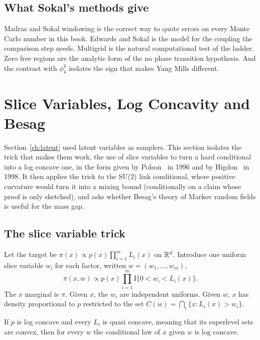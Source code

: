 \subsection{What Sokal's methods give}

Madras and Sokal windowing is the correct way to quote errors on every Monte Carlo number in this book. Edwards and Sokal is the model for the coupling the comparison step needs. Multigrid is the natural computational test of the ladder. Zero free regions are the analytic form of the no phase transition hypothesis. And the contrast with $\phi^4_4$ isolates the sign that makes Yang Mills different.

\section{Slice Variables, Log Concavity and Besag}\label{ch:slice}

Section~\ref{ch:latent} used latent variables as samplers. This section isolates the trick that makes them work, the use of slice variables to turn a hard conditional into a log concave one, in the form given by Polson~\cite{Po96} in 1996 and by Higdon~\cite{Hi98} in 1998. It then applies the trick to the SU(2) link conditional, where positive curvature would turn it into a mixing bound (conditionally on a claim whose proof is only sketched), and asks whether Besag's theory of Markov random fields is useful for the mass gap.

\subsection{The slice variable trick}\label{sec:c5slice}

Let the target be $\pi(x)\propto p(x)\prod_{i=1}^mL_i(x)$ on $\mathbb{R}^d$. Introduce one uniform slice variable $w_i$ for each factor, written $w=(w_1,\dots,w_m)$,
\[
\pi(x,w)\propto p(x)\prod_{i=1}^m\mathrm{I}\{0<w_i<L_i(x)\}.
\]
The $x$ marginal is $\pi$. Given $x$, the $w_i$ are independent uniforms. Given $w$, $x$ has density proportional to $p$ restricted to the set $C(w)=\bigcap_i\{x:L_i(x)>w_i\}$.

\begin{proposition}\label{prop:slicelc}
If $p$ is log concave and every $L_i$ is quasi concave, meaning that its superlevel sets are convex, then for every $w$ the conditional law of $x$ given $w$ is log concave.
\end{proposition}

